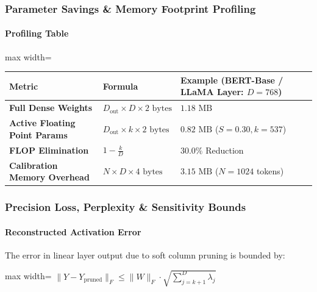 \subsubsection*{Parameter Savings \& Memory Footprint Profiling}

\paragraph{Profiling Table}

\begin{center}
\begin{adjustbox}{max width=\columnwidth}
\renewcommand{\arraystretch}{1.2}
\begin{tabular}{lll}
\toprule
Metric & Formula & Example (BERT-Base / LLaMA Layer: $D=768$) \\
\midrule
\textbf{Full Dense Weights} & $D_{\text{out}} \times D \times 2 \text{ bytes}$ & $1.18 \text{ MB}$ \\
\textbf{Active Floating Point Params} & $D_{\text{out}} \times k \times 2 \text{ bytes}$ & $0.82 \text{ MB}$ ($S=0.30, k=537$) \\
\textbf{FLOP Elimination} & $1 - \frac{k}{D}$ & $\mathbf{30.0\%}$ Reduction \\
\textbf{Calibration Memory Overhead} & $N \times D \times 4 \text{ bytes}$ & $3.15 \text{ MB}$ ($N=1024$ tokens) \\

\bottomrule
\end{tabular}
\end{adjustbox}
\end{center}

\subsubsection*{Precision Loss, Perplexity \& Sensitivity Bounds}

\paragraph{Reconstructed Activation Error}

The error in linear layer output due to soft column pruning is bounded by:

\begin{center}
\begin{adjustbox}{max width=\columnwidth}
$\displaystyle
\| Y - Y_{\text{pruned}} \|_F \le \| W \|_F \cdot \sqrt{\sum_{j=k+1}^D \lambda_j}
$
\end{adjustbox}
\end{center}

